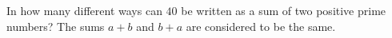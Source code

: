 In how many different ways can $40$ be written as a sum of two positive prime numbers? The sums $a+b$ and $b+a$ are considered to be the same.
